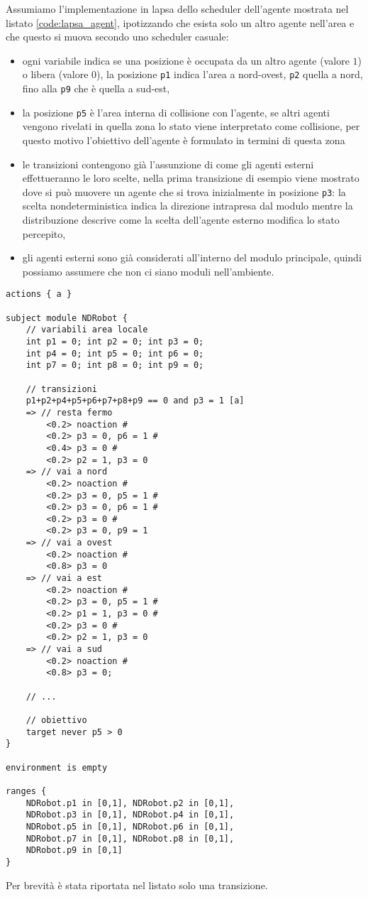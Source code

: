 Assumiamo l'implementazione in \ac{lapsa} dello scheduler dell'agente mostrata nel listato \ref{code:lapsa_agent}, ipotizzando che esista solo un altro agente nell'area e che questo si muova secondo uno scheduler casuale:
\begin{itemize}
	\item ogni variabile indica se una posizione è occupata da un altro agente (valore $1$) o libera (valore $0$), la posizione \texttt{p1} indica l'area a nord-ovest, \texttt{p2} quella a nord, fino alla \texttt{p9} che è quella a sud-est,
	\item la posizione \texttt{p5} è l'area interna di collisione con l'agente, se altri agenti vengono rivelati in quella zona lo stato viene interpretato come collisione, per questo motivo l'obiettivo dell'agente è formulato in termini di questa zona
	\item le transizioni contengono già l'assunzione di come gli agenti esterni effettueranno le loro scelte, nella prima transizione di esempio viene mostrato dove si può muovere un agente che si trova inizialmente in posizione \texttt{p3}: la scelta nondeterministica indica la direzione intrapresa dal modulo mentre la distribuzione descrive come la scelta dell'agente esterno modifica lo stato percepito,
	\item gli agenti esterni sono già considerati all'interno del modulo principale, quindi possiamo assumere che non ci siano moduli nell'ambiente.
\end{itemize}
\begin{lstlisting}[language=lapsa,style=eclipse,caption={Implementazione \ac{lapsa} dello scheduler basato su model-checking},label=code:lapsa_agent]
actions { a }

subject module NDRobot {
	// variabili area locale
	int p1 = 0; int p2 = 0; int p3 = 0;
	int p4 = 0; int p5 = 0; int p6 = 0;
	int p7 = 0; int p8 = 0; int p9 = 0;
	
	// transizioni
	p1+p2+p4+p5+p6+p7+p8+p9 == 0 and p3 = 1 [a]
	=> // resta fermo
		<0.2> noaction #
		<0.2> p3 = 0, p6 = 1 #
		<0.4> p3 = 0 #
		<0.2> p2 = 1, p3 = 0
	=> // vai a nord
		<0.2> noaction #
		<0.2> p3 = 0, p5 = 1 #
		<0.2> p3 = 0, p6 = 1 #
		<0.2> p3 = 0 #
		<0.2> p3 = 0, p9 = 1
	=> // vai a ovest
		<0.2> noaction #
		<0.8> p3 = 0
	=> // vai a est
		<0.2> noaction #
		<0.2> p3 = 0, p5 = 1 #
		<0.2> p1 = 1, p3 = 0 #
		<0.2> p3 = 0 #
		<0.2> p2 = 1, p3 = 0
	=> // vai a sud
		<0.2> noaction #
		<0.8> p3 = 0;

	// ...
	
	// obiettivo
	target never p5 > 0
}

environment is empty

ranges {
	NDRobot.p1 in [0,1], NDRobot.p2 in [0,1],
	NDRobot.p3 in [0,1], NDRobot.p4 in [0,1],
	NDRobot.p5 in [0,1], NDRobot.p6 in [0,1],
	NDRobot.p7 in [0,1], NDRobot.p8 in [0,1],
	NDRobot.p9 in [0,1]
}
\end{lstlisting}
Per brevità è stata riportata nel listato solo una transizione. 


